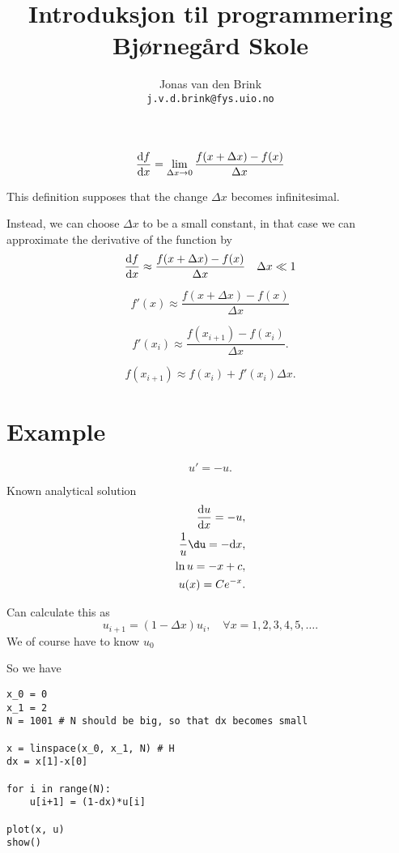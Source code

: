 \documentclass[a4paper, 11pt, notitlepage]{article}
\author{Jonas van den Brink \\[-0.2cm] \texttt{j.v.d.brink@fys.uio.no}}
\title{Introduksjon til programmering \\ Bjørnegård Skole}
\renewcommand{\d}{{\rm d}}
\begin{document}

\thispagestyle{empty}
\vspace{1.8cm}


\begin{equation}
\frac{\d f}{\d x} = \lim_{\Delta x \to 0} \frac{f(x+\Delta x) - f(x)}{\Delta x}
\end{equation}

This definition supposes that the change $\Delta x$ becomes infinitesimal. 

Instead, we can choose $\Delta x$ to be a small constant, in that case we can approximate the derivative of the function by
\begin{equation}
\frac{\d f}{\d x} \approx \frac{f(x+\Delta x) - f(x)}{\Delta x} \quad \Delta x \ll 1
\end{equation}

$$f'(x) \approx \frac{f(x+\Delta x) - f(x)}{\Delta x}$$

$$f'(x_i) \approx \frac{f(x_{i+1}) - f(x_i)}{\Delta x}.$$

$$f(x_{i+1}) \approx f(x_i) + f'(x_i)\Delta x.$$

\section{Example}

$$u' = -u.$$

Known analytical solution
\begin{align*}
\frac{\d u}{\d x} = -u, \\
\frac{1}{u} \du = -\d x, \\
\ln u = -x + c, \\
u(x) = Ce^{-x}.
\end{align*}

Can calculate this as
$$u_{i+1} = (1-\Delta x) u_i, \quad \forall x=1,2,3,4,5,\ldots.$$
We of course have to know $u_0$

So we have
\begin{lstlisting}
x_0 = 0
x_1 = 2
N = 1001 # N should be big, so that dx becomes small

x = linspace(x_0, x_1, N) # H
dx = x[1]-x[0]

for i in range(N):
	u[i+1] = (1-dx)*u[i]

plot(x, u)
show()
\end{lstlisting}
\end{document}
